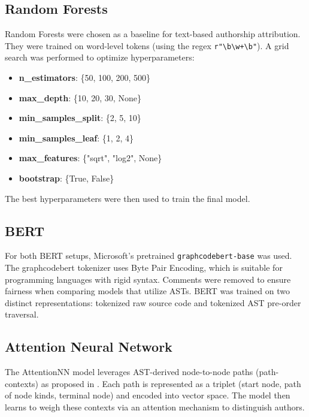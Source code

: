 \documentclass[conference]{IEEEtran}
\begin{document}
\subsection{Random Forests}
Random Forests were chosen as a baseline for text-based authorship attribution. They were trained on word-level tokens (using the regex \verb|r"\b\w+\b"|). A grid search was performed to optimize hyperparameters:
\begin{itemize}
    \item \textbf{n\_estimators}: \{50, 100, 200, 500\}
    \item \textbf{max\_depth}: \{10, 20, 30, None\}
    \item \textbf{min\_samples\_split}: \{2, 5, 10\}
    \item \textbf{min\_samples\_leaf}: \{1, 2, 4\}
    \item \textbf{max\_features}: \{"sqrt", "log2", None\}
    \item \textbf{bootstrap}: \{True, False\}
\end{itemize}
The best hyperparameters were then used to train the final model.

\subsection{BERT}
For both BERT setups, Microsoft’s pretrained \texttt{graphcodebert-base} \cite{codebert} was used. The graphcodebert tokenizer uses Byte Pair Encoding, which is suitable for programming languages with rigid syntax. Comments were removed to ensure fairness when comparing models that utilize ASTs. BERT was trained on two distinct representations: tokenized raw source code and tokenized AST pre-order traversal.

\subsection{Attention Neural Network}
The AttentionNN model leverages AST-derived node-to-node paths (path-contexts) as proposed in \cite{code2vec}. Each path is represented as a triplet (start node, path of node kinds, terminal node) and encoded into vector space. The model then learns to weigh these contexts via an attention mechanism to distinguish authors.
\end{document}
